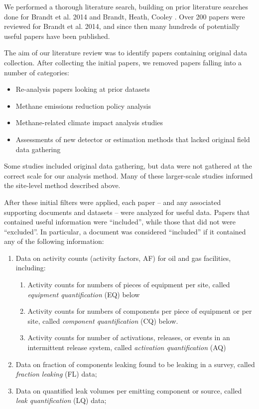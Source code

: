 \documentclass[11pt]{report}
\begin{document}
{{{{We performed a thorough literature search, building on prior literature searches done for Brandt et al. 2014 \cite{Brandt2014} and Brandt, Heath, Cooley \cite{Brandt2016}. Over 200 papers were reviewed for Brandt et al. 2014, and since then many hundreds of potentially useful papers have been published.

The aim of our literature review was to identify papers containing original data collection. After collecting the initial papers, we removed papers falling into a number of categories:
\begin{itemize}
\item Re-analysis papers looking at prior datasets
\item Methane emissions reduction policy analysis
\item Methane-related climate impact analysis studies
\item Assessments of new detector or estimation methods that lacked original field data gathering
\end{itemize}
Some studies included original data gathering, but data were not gathered at the correct scale for our analysis method.  Many of these larger-scale studies informed the site-level method described above. 

After these initial filters were applied, each paper -- and any associated supporting documents and datasets -- were analyzed for useful data.  Papers that contained useful information were ``included'', while those that did not were ``excluded''. In particular, a document was considered ``included'' if it contained any of the following information:

\begin{enumerate}
\item Data on activity counts (activity factors, AF) for oil and gas facilities, including:
	\begin{enumerate}
	\item Activity counts for numbers of pieces of equipment per site, called \textit{equipment quantification} (EQ) below
	\item Activity counts for numbers of components per piece of equipment or per site, called \textit{component quantification} (CQ) below.
	\item Activity counts for number of activations, releases, or events in an intermittent release system, called \textit{activation quantification} (AQ)
	\end{enumerate}
\item Data on fraction of components leaking found to be leaking in a survey, called \textit{fraction leaking} (FL) data;
\item Data on quantified leak volumes per emitting component or source, called \textit{leak quantification} (LQ) data;
\end{enumerate}

}}}}
\end{document}

